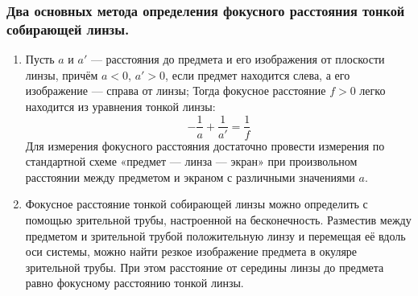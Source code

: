 \documentclass[a4paper,12pt]{article}
\newcommand{\RNumCaps}[1]
{\MakeUppercase{\romannumeral #1}}
\begin{document}
\subsubsection*{Два основных метода определения фокусного расстояния тонкой собирающей линзы.}
\begin{enumerate}
	\item[\textbf{\RNumCaps{1}}] 
	Пусть $a$ и $a'$ — расстояния до предмета и его изображения от плоскости линзы, причём $a < 0$, $a' > 0$, если предмет находится слева, а его изображение — справа от линзы; Тогда фокусное расстояние $f > 0$ легко находится из уравнения тонкой линзы:
	\begin{equation}\label{formula6}
	-\frac{1}{a} + \frac{1}{a'} = \frac{1}{f}
	\end{equation}
	Для измерения фокусного расстояния достаточно провести измерения по стандартной схеме «предмет — линза — экран» при произвольном расстоянии между предметом и экраном с различными значениями $a$.
	\item[\textbf{\RNumCaps{2}}] Фокусное расстояние тонкой собирающей линзы можно определить с помощью зрительной трубы, настроенной на бесконечность. Разместив между предметом и зрительной трубой положительную линзу и перемещая её вдоль оси системы, можно найти резкое изображение предмета в окуляре зрительной трубы. При этом расстояние от середины линзы до предмета равно фокусному расстоянию тонкой линзы.
\end{enumerate}
\end{document}
